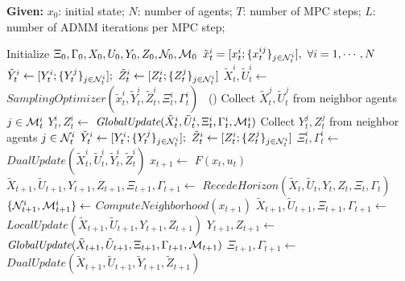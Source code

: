 \begin{algorithm}[t]
\caption{Distributed Sampling-based MPC}
\begin{algorithmic}[1]
\STATE \textbf{Given:} $x_0$: initial state; $N$: number of agents; $T$: number of MPC steps; $L$: number of ADMM iterations per MPC step;

\STATE Initialize $\Xi_0, \Gamma_0, X_0, U_0, Y_0, Z_0, {\cal N}_0, {\cal M}_0$
\STATE $\tilde{x}_t^i = [x^i_t;\{x^{ij}_t\}_{j\in{\cal N}^i_t}], \ \forall i=1,\cdots,N$
\STATE $\tilde{Y}_t^i \leftarrow [Y^i_t; \{Y^j_t\}_{j\in{\cal N}^i_t}]; \ \tilde{Z}_t^i \leftarrow [Z^i_t; \{Z^j_t\}_{j\in{\cal N}^i_t}]$
\STATE $\tilde{X}_t^i, \tilde{U}_t^i \leftarrow$ $\textit{SamplingOptimizer}(\tilde{x}_t^i, \tilde{Y}_t^i, \tilde{Z}_t^i, \Xi_t^i, \Gamma_t^i)$ \ ()
\STATE Collect $\tilde{X}_t^j, \tilde{U}_t^j$ from neighbor agents $j\in{\cal M}^i_t$
\STATE $Y^i_t, Z^i_t \leftarrow$ $\textit{GlobalUpdate}(\tilde{X}_t^i, \tilde{U}_t^i, \Xi_t^i, \Gamma_t^i, {\cal M}^i_t)$
\STATE Collect $Y^j_t, Z^j_t$ from neighbor agents $j\in{\cal N}^i_t$
\STATE $\tilde{Y}_t^i \leftarrow [Y^i_t; \{Y^j_t\}_{j\in{\cal N}^i_t}]; \ \tilde{Z}_t^i \leftarrow [Z^i_t; \{Z^j_t\}_{j\in{\cal N}^i_t}]$
\STATE $\Xi^i_t, \Gamma^i_t \leftarrow$ $\textit{DualUpdate}(\tilde{X}^i_t, \tilde{U}^i_t, \tilde{Y}^i_t, \tilde{Z}^i_t)$
\ENDFOR
\ENDFOR
\STATE $x_{t+1} \leftarrow$ $F(x_t, u_t)$
\STATE $\tilde{X}_{t+1}, \tilde{U}_{t+1}, Y_{t+1}, Z_{t+1}, \Xi_{t+1}, \Gamma_{t+1} \leftarrow$ $\textit{RecedeHorizon}(\tilde{X}_{t}, \tilde{U}_{t}, Y_{t}, Z_{t}, \Xi_{t}, \Gamma_{t})$
\STATE $\{{\cal N}^i_{t+1}, {\cal M}^i_{t+1}\} \leftarrow $ $\textit{ComputeNeighborhood}(x_{t+1})$
\STATE $\tilde{X}_{t+1}, \tilde{U}_{t+1}, \Xi_{t+1}, \Gamma_{t+1} \leftarrow$ $\textit{LocalUpdate}(\tilde{X}_{t+1}, \tilde{U}_{t+1}, Y_{t+1}, Z_{t+1})$
\STATE $Y_{t+1}, Z_{t+1} \leftarrow$ $\textit{GlobalUpdate}(\tilde{X}_{t+1}, \tilde{U}_{t+1}, \Xi_{t+1}, \Gamma_{t+1}, {\cal M}_{t+1})$
\STATE $\Xi_{t+1}, \Gamma_{t+1} \leftarrow$ $\textit{DualUpdate}(\tilde{X}_{t+1}, \tilde{U}_{t+1}, \tilde{Y}_{t+1}, \tilde{Z}_{t+1})$
\ENDFOR
\end{algorithmic}
\label{alg: dist_MPC}
\end{algorithm}